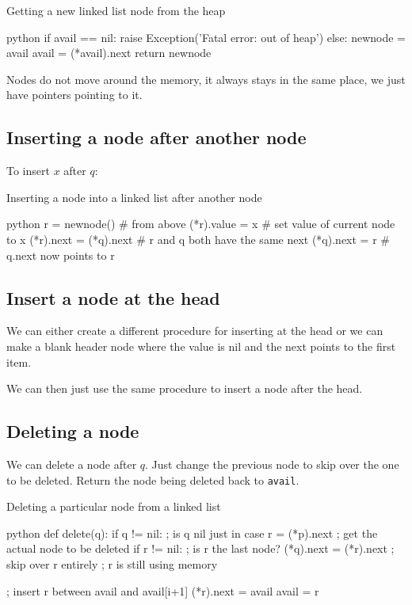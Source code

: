 \begin{highlight}{Getting a new linked list node from the heap}
	\begin{code}{python}
		if avail == nil:
		raise Exception('Fatal error: out of heap')
		else:
		newnode = avail
		avail = (*avail).next
		return newnode
	\end{code}
\end{highlight}

\begin{note}
	Nodes do not move around the memory, it always stays in the same place, we just have pointers pointing to it.
\end{note}

\subsection{Inserting a node after another node}\label{sub:inserting_a_node_after_another_node}

To insert \(x\) after \(q\):
\begin{highlight}{Inserting a node into a linked list after another node}
	\begin{code}{python}
		r = newnode() # from above
		(*r).value = x # set value of current node to x
		(*r).next = (*q).next # r and q both have the same next
		(*q).next = r # q.next now points to r
	\end{code}
\end{highlight}

\subsection{Insert a node at the head}\label{sub:insert_a_node_at_the_head}

We can either create a different procedure for inserting at the head or we can make a blank header node where the value is nil and the next points to the first item.

We can then just use the same procedure to insert a node after the head.

\subsection{Deleting a node}\label{sub:deleting_a_node}

We can delete a node after \(q\).
Just change the previous node to skip over the one to be deleted.
Return the node being deleted back to \texttt{avail}.

\begin{highlight}{Deleting a particular node from a linked list}
	\begin{code}{python}
		def delete(q):
		if q != nil: ; is q nil just in case
		r = (*p).next ; get the actual node to be deleted
		if r != nil: ; is r the last node?
		(*q).next = (*r).next ; skip over r entirely
		; r is still using memory

		; insert r between avail and avail[i+1]
		(*r).next = avail
		avail = r
	\end{code}
\end{highlight}

